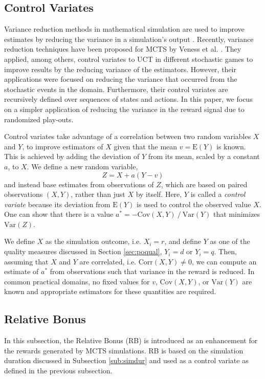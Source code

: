 \documentclass{ecai2014}
\newcommand{\E}[1]{\mathrm{E}\left( #1 \right)}
\newcommand{\Var}[1]{\mathrm{Var}\left( #1 \right)}
\newcommand{\Cov}[1]{\mathrm{Cov}\left( #1 \right)}
\newcommand{\Corr}[1]{\mathrm{Corr}\left( #1 \right)}
\begin{document}
\subsection{Control Variates}
\label{sub:cv}
Variance reduction methods in mathematical simulation are used to improve estimates by reducing the variance in a simulation's output \cite{kelton2000simulation}. Recently, variance reduction techniques have been proposed for MCTS by Veness et al. \cite{Veness11variance}. They applied, among others, control variates to UCT in different stochastic games to improve results by the reducing variance of the estimators. However, their applications were focused on reducing the variance that occurred from the stochastic events in the domain. Furthermore, their control variates are recursively defined over sequences of states and actions. In this paper, we focus on a simpler application of reducing the variance in the reward signal due to randomized play-outs.  

Control variates take advantage of a correlation between two random variables $X$ and $Y$, to improve estimators of $X$ given that the mean $v=\E{Y}$ is known. This is achieved by adding the deviation of $Y$ from its mean, scaled by a constant $a$, to $X$. We define a new random variable, 
\begin{equation}
Z=X+a\left(Y-v\right)
\label{eq:cv}
\end{equation}
and instead base estimates from observations of $Z$, which are based on paired observations $(X,Y)$, rather than just $X$ by itself. 
Here, $Y$ is called a {\it control variate} because its deviation from $\E{Y}$ is used to control the observed value $X$. 
One can show that there is a value $a^*=-\Cov{X,Y}\mathbin{/}\Var{Y}$ that minimizes $\Var{Z}$.

We define $X$ as the simulation outcome, i.e. $X_i=r$, and define $Y$ as one of the quality measures discussed in Section \ref{sec:poqual}, $Y_i=d$ or $Y_i=q$. Then, assuming that $X$ and $Y$ are correlated, i.e. $\Corr{X,Y}\neq0$, we can compute an estimate of  $a^*$ from observations such that variance in the reward is reduced. In common practical domains, no fixed values for $v$, $\Cov{X,Y}$, or $\Var{Y}$ are known and appropriate estimators for these quantities are required.

\subsection{Relative Bonus}
\label{subsec:rb}
In this subsection, the Relative Bonus (RB) is introduced as an enhancement for the rewards generated by MCTS simulations. RB is based on the simulation duration discussed in Subsection \ref{sub:simdur} and used as a control variate as defined in the previous subsection.
\end{document}
